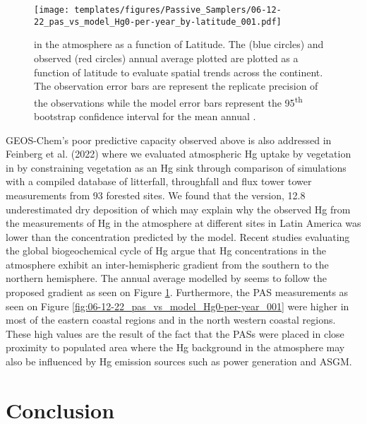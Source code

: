 \begin{figure}[H]
  \texttt{[image: templates/figures/Passive\_Samplers/06-12-22\_pas\_vs\_model\_Hg0-per-year\_by-latitude\_001.pdf]}
  \caption{\hg in the atmosphere as a function of Latitude. The \on (blue circles) and observed (red circles) annual average \hg plotted are plotted as a function of latitude to evaluate spatial trends across the continent. The observation error bars are represent the replicate precision of the observations while the model error bars represent the 95\textsuperscript{th} bootstrap confidence interval for the mean annual \hg.}
  \label{fig:06-12-22_pas_vs_model_Hg0-per-year_by-latitude_001}
  \centering
  
\end{figure}
\FloatBarrier

\begin{flushleft}
GEOS-Chem's poor predictive capacity observed above is also addressed in Feinberg et al. (2022) where we evaluated atmospheric Hg uptake by vegetation in \gc by constraining vegetation as an Hg sink through comparison of simulations with a compiled database of litterfall, throughfall and flux tower tower measurements from 93 forested sites. We found that the \gc version, 12.8  underestimated dry deposition of \hg which may explain why the observed Hg from the measurements of Hg in the atmosphere at different sites in Latin America was lower than the concentration predicted by the model. Recent studies evaluating the global biogeochemical cycle of Hg argue that Hg concentrations in the atmosphere exhibit an inter-hemispheric gradient from the southern to the northern hemisphere. The annual average \hg modelled by \gc seems to follow the proposed gradient as seen on Figure \ref{fig:06-12-22_pas_vs_model_Hg0-per-year_by-latitude_001}. Furthermore, the PAS measurements as seen on Figure \ref{fig:06-12-22_pas_vs_model_Hg0-per-year_001} were higher in most of the eastern coastal regions and in the north western coastal regions. These high values are the result of the fact that the PASs were placed in close proximity to populated area where the Hg background in the atmosphere may also be influenced by Hg emission sources such as power generation and ASGM.

\end{flushleft}











\section{Conclusion}

